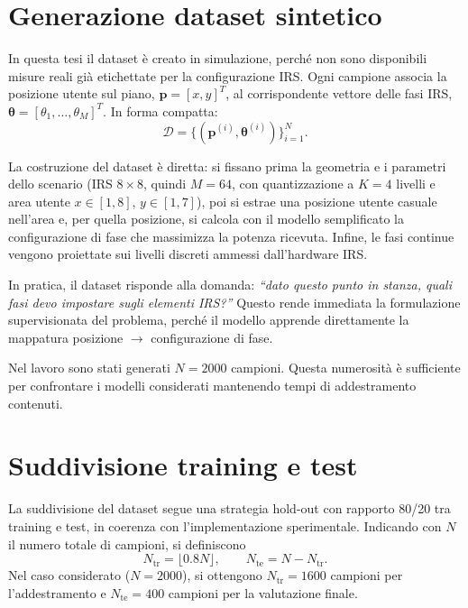 \documentclass[12pt,a4paper]{report}
\begin{document}
\section{Generazione dataset sintetico}
In questa tesi il dataset è creato in simulazione, perché non sono
disponibili misure reali già etichettate per la configurazione IRS.
Ogni campione associa la posizione utente sul piano,
$\mathbf{p}=[x,y]^T$, al corrispondente vettore delle fasi IRS,
$\boldsymbol{\theta}=[\theta_1,\dots,\theta_M]^T$. In forma compatta:
\begin{equation}
  \mathcal{D}=\{(\mathbf{p}^{(i)},\boldsymbol{\theta}^{(i)})\}_{i=1}^{N}.
\end{equation}

La costruzione del dataset è diretta: si fissano prima la geometria e
i parametri dello scenario (IRS $8\times 8$, quindi $M=64$, con
  quantizzazione a $K=4$ livelli e area utente $x\in[1,8]$,
$y\in[1,7]$), poi si estrae una posizione utente casuale nell'area e,
per quella posizione, si calcola con il modello semplificato la
configurazione di fase che massimizza la potenza ricevuta. Infine, le
fasi continue vengono proiettate sui livelli discreti ammessi dall'hardware IRS.

In pratica, il dataset risponde alla domanda: \emph{``dato questo
punto in stanza, quali fasi devo impostare sugli elementi IRS?''}
Questo rende immediata la formulazione supervisionata del problema,
perché il modello apprende direttamente la mappatura posizione
$\rightarrow$ configurazione di fase.

Nel lavoro sono stati generati $N=2000$ campioni. Questa numerosità è
sufficiente per confrontare i modelli considerati mantenendo tempi di
addestramento contenuti.

\section{Suddivisione training e test}
La suddivisione del dataset segue una strategia hold-out con rapporto
80/20 tra training e test, in coerenza con l'implementazione
sperimentale. Indicando con $N$ il numero totale di campioni, si definiscono
\begin{equation}
  N_{\mathrm{tr}}=\lfloor 0.8N \rfloor,
  \qquad
  N_{\mathrm{te}}=N-N_{\mathrm{tr}}.
\end{equation}
Nel caso considerato ($N=2000$), si ottengono $N_{\mathrm{tr}}=1600$
campioni per l'addestramento e $N_{\mathrm{te}}=400$ campioni per la
valutazione finale.
\end{document}
